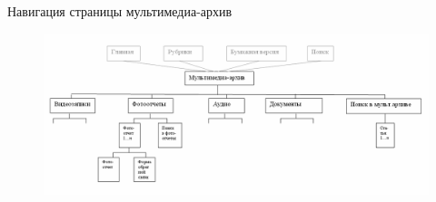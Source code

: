 \documentclass{beamer}
\begin{document}
\begin{frame}[t]{Навигация страницы мультимедиа-архив}
\begin{figure}[h]
\centering
\includegraphics[scale=0.4]{images/lec03-pic15-ex04.png}
\end{figure}
\end{frame}
\end{document}

